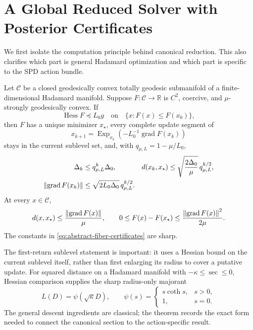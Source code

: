 \section{A Global Reduced Solver with Posterior Certificates}
\label{sec:certified-solver}

We first isolate the computation principle behind canonical reduction.  This
also clarifies which part is general Hadamard optimization and which part is
specific to the SPD action bundle.

\begin{theorem}
\label{thm:canonical-fiber-engine}
Let \(\mathcal C\) be a closed geodesically convex totally geodesic
submanifold of a finite-dimensional Hadamard manifold.  Suppose
\(F:\mathcal C\to\mathbb R\) is \(C^2\), coercive, and
\(\mu\)-strongly geodesically convex.  If
\[
  \operatorname{Hess}F\preceq L_0g
  \quad\text{on}\quad
  \{x:F(x)\le F(x_0)\},
\]
then \(F\) has a unique minimizer \(x_\star\), every complete update segment
of
\begin{equation}
  x_{k+1}
  =\operatorname{Exp}_{x_k}
   \left(-L_0^{-1}\operatorname{grad}F(x_k)\right)
  \label{eq:abstract-fiber-update}
\end{equation}
stays in the current sublevel set, and, with
\(q_{\mu,L}=1-\mu/L_0\),
\begin{align}
  \Delta_k&\le q_{\mu,L}^k\Delta_0,
  &
  d(x_k,x_\star)
  &\le\sqrt{\frac{2\Delta_0}{\mu}}\,q_{\mu,L}^{k/2},
  \label{eq:abstract-fiber-rates}\\
  \left\lVert \operatorname{grad}F(x_k)\right\rVert
  &\le\sqrt{2L_0\Delta_0}\,q_{\mu,L}^{k/2}.
  \label{eq:abstract-fiber-gradient-rate}
\end{align}
At every \(x\in\mathcal C\),
\begin{equation}
  d(x,x_\star)\le\frac{\left\lVert \operatorname{grad}F(x)\right\rVert}{\mu},
  \qquad
  0\le F(x)-F(x_\star)
  \le\frac{\left\lVert \operatorname{grad}F(x)\right\rVert^2}{2\mu}.
  \label{eq:abstract-fiber-certificates}
\end{equation}
The constants in \eqref{eq:abstract-fiber-certificates} are sharp.
\end{theorem}

The first-return sublevel statement is important: it uses a Hessian bound on
the current sublevel itself, rather than first enlarging its radius to cover a
putative update.  For squared distance on a Hadamard manifold with
\(-\kappa\le\operatorname{sec}\le0\), Hessian comparison supplies the sharp
radius-only majorant
\begin{equation}
  L(D)=\psi(\sqrt\kappa D),
  \qquad
  \psi(s)=
  \begin{cases}
    s\coth s,&s>0,\\
    1,&s=0.
  \end{cases}
  \label{eq:hessian-comparison-factor}
\end{equation}
The general descent ingredients are classical; the theorem records the exact
form needed to connect the canonical section to the action-specific result.


